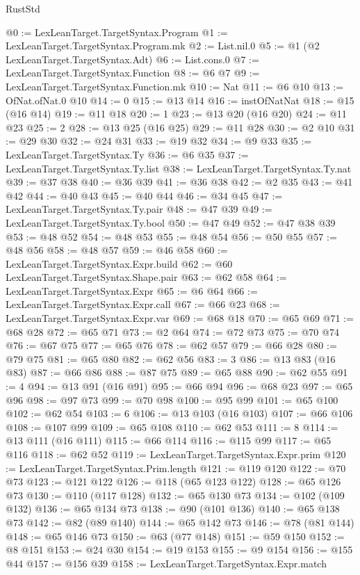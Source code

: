 \begin{lexlean}{RustStd}
\begin{coremodule}
@0 := LexLeanTarget.TargetSyntax.Program
@1 := LexLeanTarget.TargetSyntax.Program.mk
@2 := List.nil.{0}
@5 := @1 (@2 LexLeanTarget.TargetSyntax.Adt)
@6 := List.cons.{0}
@7 := LexLeanTarget.TargetSyntax.Function
@8 := @6 @7
@9 := LexLeanTarget.TargetSyntax.Function.mk
@10 := Nat
@11 := @6 @10
@13 := OfNat.ofNat.{0} @10
@14 := 0
@15 := @13 @14
@16 := instOfNatNat
@18 := @15 (@16 @14)
@19 := @11 @18
@20 := 1
@23 := @13 @20 (@16 @20)
@24 := @11 @23
@25 := 2
@28 := @13 @25 (@16 @25)
@29 := @11 @28
@30 := @2 @10
@31 := @29 @30
@32 := @24 @31
@33 := @19 @32
@34 := @9 @33
@35 := LexLeanTarget.TargetSyntax.Ty
@36 := @6 @35
@37 := LexLeanTarget.TargetSyntax.Ty.list
@38 := LexLeanTarget.TargetSyntax.Ty.nat
@39 := @37 @38
@40 := @36 @39
@41 := @36 @38
@42 := @2 @35
@43 := @41 @42
@44 := @40 @43
@45 := @40 @44
@46 := @34 @45
@47 := LexLeanTarget.TargetSyntax.Ty.pair
@48 := @47 @39
@49 := LexLeanTarget.TargetSyntax.Ty.bool
@50 := @47 @49
@52 := @47 @38 @39
@53 := @48 @52
@54 := @48 @53
@55 := @48 @54
@56 := @50 @55
@57 := @48 @56
@58 := @48 @57
@59 := @46 @58
@60 := LexLeanTarget.TargetSyntax.Expr.build
@62 := @60 LexLeanTarget.TargetSyntax.Shape.pair
@63 := @62 @58
@64 := LexLeanTarget.TargetSyntax.Expr
@65 := @6 @64
@66 := LexLeanTarget.TargetSyntax.Expr.call
@67 := @66 @23
@68 := LexLeanTarget.TargetSyntax.Expr.var
@69 := @68 @18
@70 := @65 @69
@71 := @68 @28
@72 := @65 @71
@73 := @2 @64
@74 := @72 @73
@75 := @70 @74
@76 := @67 @75
@77 := @65 @76
@78 := @62 @57
@79 := @66 @28
@80 := @79 @75
@81 := @65 @80
@82 := @62 @56
@83 := 3
@86 := @13 @83 (@16 @83)
@87 := @66 @86
@88 := @87 @75
@89 := @65 @88
@90 := @62 @55
@91 := 4
@94 := @13 @91 (@16 @91)
@95 := @66 @94
@96 := @68 @23
@97 := @65 @96
@98 := @97 @73
@99 := @70 @98
@100 := @95 @99
@101 := @65 @100
@102 := @62 @54
@103 := 6
@106 := @13 @103 (@16 @103)
@107 := @66 @106
@108 := @107 @99
@109 := @65 @108
@110 := @62 @53
@111 := 8
@114 := @13 @111 (@16 @111)
@115 := @66 @114
@116 := @115 @99
@117 := @65 @116
@118 := @62 @52
@119 := LexLeanTarget.TargetSyntax.Expr.prim
@120 := LexLeanTarget.TargetSyntax.Prim.length
@121 := @119 @120
@122 := @70 @73
@123 := @121 @122
@126 := @118 (@65 @123 @122)
@128 := @65 @126 @73
@130 := @110 (@117 @128)
@132 := @65 @130 @73
@134 := @102 (@109 @132)
@136 := @65 @134 @73
@138 := @90 (@101 @136)
@140 := @65 @138 @73
@142 := @82 (@89 @140)
@144 := @65 @142 @73
@146 := @78 (@81 @144)
@148 := @65 @146 @73
@150 := @63 (@77 @148)
@151 := @59 @150
@152 := @8 @151
@153 := @24 @30
@154 := @19 @153
@155 := @9 @154
@156 := @155 @44
@157 := @156 @39
@158 := LexLeanTarget.TargetSyntax.Expr.match

\end{coremodule}
\end{lexlean}
